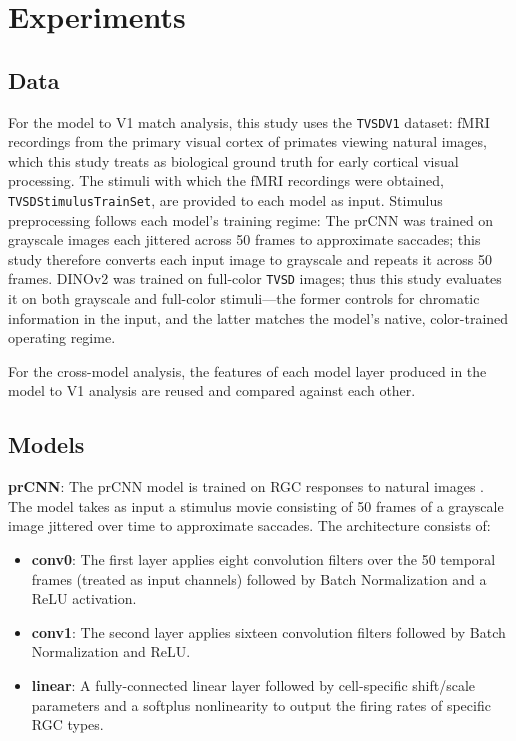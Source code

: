 \documentclass{article}
\begin{document}
\section{Experiments}

\subsection{Data}
For the model to V1 match analysis, this study uses the \texttt{TVSDV1} dataset: fMRI recordings from
the primary visual cortex of primates viewing natural images, which this study treats as
biological ground truth for early cortical visual processing. The stimuli with which the 
fMRI recordings were obtained, \texttt{TVSDStimulusTrainSet}, are provided to each model as input.
Stimulus preprocessing
follows each model's training regime: The prCNN was trained on grayscale
images each jittered across 50 frames to approximate saccades; this study therefore converts each
input image to grayscale and repeats it across 50 frames. DINOv2 was
trained on full-color \texttt{TVSD} images; thus this study evaluates it on both grayscale and
full-color stimuli---the former controls for chromatic information in the input, and the
latter matches the model's native, color-trained operating regime.

For the cross-model analysis, the features of each model layer produced in the
model to V1 analysis are reused and compared against each other. 

\subsection{Models}
\textbf{prCNN}: The prCNN model is trained on RGC responses
to natural images \cite{alex_retina_cnn}. The model takes as input a stimulus
movie consisting of 50 frames of a grayscale image jittered over time to approximate saccades. 
The architecture consists of:
\begin{itemize}
    \item \textbf{conv0}: The first layer applies eight convolution filters over the
    50 temporal frames (treated as input channels) followed by
    Batch Normalization and a ReLU activation.
    \item \textbf{conv1}: The second layer applies sixteen convolution filters followed by
    Batch Normalization and ReLU.
    \item \textbf{linear}: A fully-connected linear layer followed by cell-specific shift/scale
    parameters and a softplus nonlinearity to output the firing rates of
    specific RGC types.
\end{itemize}
\end{document}
